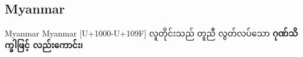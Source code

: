 \subsection{Myanmar}
\newfontfamily{}

\begin{scriptexample}[]{Myanmar}
\bgroup
Myanmar [U+1000-U+109F]
\myanmar
လူတိုင်းသည် တူညီ လွတ်လပ်သော {\bfseries ဂုဏ်သိက္ခါဖြင့်
လည်းကောင်း၊}
\egroup
\end{scriptexample}